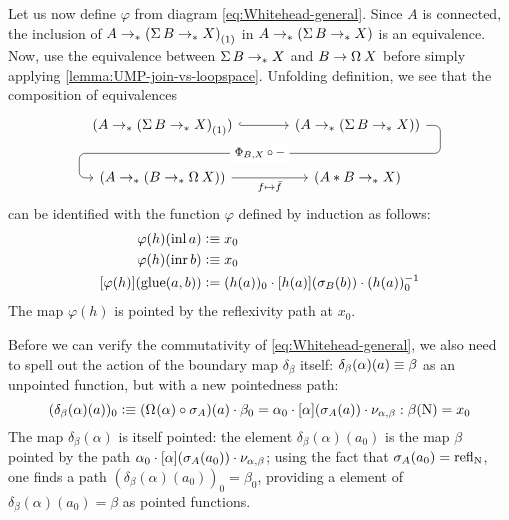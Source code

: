 \documentclass[english,a4paper]{lmcs}
\begin{document}
Let us now define $\varphi$ from diagram \eqref{eq:Whitehead-general}.
Since $A$ is connected, the inclusion of
$A \to_\ast {(\operatorname{\Sigma}B \to_\ast X)}_{\left(1\right)}$
in $A \to_\ast (\operatorname{\Sigma} B \to_\ast X)$ is an equivalence.
Now, use the equivalence between $\operatorname{\Sigma} B \to_\ast X$
and $B \to \loopspace\null X$ before
simply applying \cref{lemma:UMP-join-vs-loopspace}.
Unfolding definition, we see that the composition of
equivalences
\begin{equation}
  \begin{tikzcd}[column sep=large]
    (A \ptdto \conncomp{(\susp B \ptdto X)}{\wunit}) \rar[hookrightarrow]
    & (A \ptdto (\susp B \ptdto X)) \dlar[
      rounded corners,
      to path={
        (\tikztostart.east) -|
        ([xshift=1em, yshift=-2em]\tikztostart.east) -|
        node[near start, fill=white] {\footnotesize$\Phi_{B,X}\circ \blank$}
        ([xshift=-1em]\tikztotarget.west) --
        (\tikztotarget.west)
      }
    ]\\
    (A \ptdto (B \ptdto \loopspace{}X)) \rar["f \mapsto \bar f"']
    & (A*B \ptdto X)
  \end{tikzcd}
  \label{eq:def-varphi-no-smash}
\end{equation}
can be identified with the function $\varphi$ defined by induction as follows:
\begin{equation}
  \begin{aligned}
  \varphi(h) (\mathop{\mathrm{inl}} a) &\vcentcolon\equiv x_0 \\
  \varphi(h) (\mathop{\mathrm{inr}} b) &\vcentcolon\equiv x_0 \\
  \mathop{\left[{\varphi(h)}\right]} (\operatorname{\mathrm{glue}}(a,b))
                      &\vcentcolon= (h(a))_0 \cdot \mathop{\left[{h(a)}\right]}(\sigma_B(b))
                        \cdot (h(a))_0^{-1}
  \end{aligned}
\end{equation}
The map $\varphi(h)$ is pointed by the reflexivity path at $x_0$.

Before we can verify the commutativity of \eqref{eq:Whitehead-general},
we also need to spell out the action of the boundary map $\delta_\beta$ itself:
$\delta_\beta(\alpha)(a) \equiv \beta$ as an unpointed function,
but with a new pointedness path:
\begin{equation}
  (\delta_\beta(\alpha)(a))_0 \defequi
  (\loopspace\null(\alpha)\circ\sigma_A)(a) \cdot \beta_0
  = \alpha_0 \cdot \ap{\alpha}(\sigma_A(a)) \cdot \miniast\alpha\beta
  : \beta(\north) = x_0
\end{equation}
The map $\delta_\beta(\alpha)$ is itself pointed: the element
$\delta_\beta(\alpha)(a_0)$ is the map $\beta$ pointed by the path
$\alpha_0\cdot \mathop{\left[{\alpha}\right]}(\sigma_A(a_0)) \cdot \nu_{\alpha,\beta}$;
using the fact that $\sigma_A(a_0) = \mathop{{\mathrm{refl}}_{\mathrm{N}}}$, one finds a path
$(\delta_\beta(\alpha)(a_0))_0 = \beta_0$, providing a element of
$\delta_\beta(\alpha)(a_0) = \beta$ as pointed functions.
\end{document}
